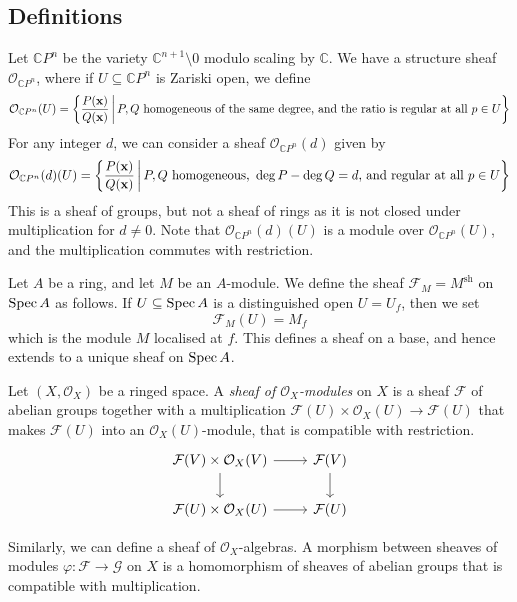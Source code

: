 \subsection{Definitions}
\begin{example}
    Let \( \mathbb CP^n \) be the variety \( \mathbb C^{n+1} \setminus \qty{0} \) modulo scaling by \( \mathbb C \).
    We have a structure sheaf \( \mathcal O_{\mathbb CP^n} \), where if \( U \subseteq \mathbb CP^n \) is Zariski open, we define
    \[ \mathcal O_{\mathbb CP^n}(U) = \qty{\frac{P(\vb x)}{Q(\vb x)} \,\middle|\,P, Q \text{ homogeneous of the same degree, and the ratio is regular at all } p \in U} \]
    For any integer \( d \), we can consider a sheaf \( \mathcal O_{\mathbb CP^n}(d) \) given by
    \[ \mathcal O_{\mathbb CP^n}(d)(U) = \qty{\frac{P(\vb x)}{Q(\vb x)} \,\middle|\,P, Q \text{ homogeneous, } \deg P - \deg Q = d\text{, and regular at all } p \in U} \]
    This is a sheaf of groups, but not a sheaf of rings as it is not closed under multiplication for \( d \neq 0 \).
    Note that \( \mathcal O_{\mathbb CP^n}(d)(U) \) is a module over \( \mathcal O_{\mathbb CP^n}(U) \), and the multiplication commutes with restriction.
\end{example}
\begin{example}
    Let \( A \) be a ring, and let \( M \) be an \( A \)-module.
    We define the sheaf \( \mathcal F_M = M^{\mathrm{sh}} \) on \( \operatorname{Spec} A \) as follows.
    If \( U \subseteq \operatorname{Spec} A \) is a distinguished open \( U = U_f \), then we set
    \[ \mathcal F_M(U) = M_f \]
    which is the module \( M \) localised at \( f \).
    This defines a sheaf on a base, and hence extends to a unique sheaf on \( \operatorname{Spec} A \).
\end{example}
\begin{definition}
    Let \( (X, \mathcal O_X) \) be a ringed space.
    A \emph{sheaf of \( \mathcal O_X \)-modules} on \( X \) is a sheaf \( \mathcal F \) of abelian groups together with a multiplication \( \mathcal F(U) \times \mathcal O_X(U) \to \mathcal F(U) \) that makes \( \mathcal F(U) \) into an \( \mathcal O_X(U) \)-module, that is compatible with restriction.
\[\begin{tikzcd}
	{\mathcal F(V) \times \mathcal O_X(V)} & {\mathcal F(V)} \\
	{\mathcal F(U) \times \mathcal O_X(U)} & {\mathcal F(U)}
	\arrow[from=1-1, to=1-2]
	\arrow[from=1-2, to=2-2]
	\arrow[from=1-1, to=2-1]
	\arrow[from=2-1, to=2-2]
\end{tikzcd}\]
\end{definition}
Similarly, we can define a sheaf of \( \mathcal O_X \)-algebras.
A morphism between sheaves of modules \( \varphi : \mathcal F \to \mathcal G \) on \( X \) is a homomorphism of sheaves of abelian groups that is compatible with multiplication.

